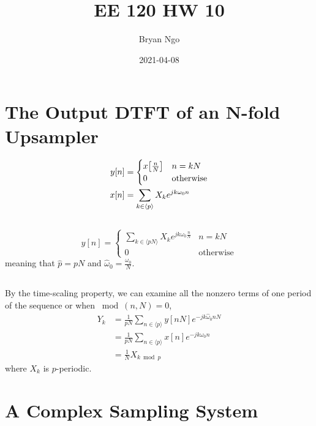 \documentclass{article}
\title{EE 120 HW 10}
\author{Bryan Ngo}
\date{2021-04-08}
\begin{document}
\maketitle

\section{The Output DTFT of an N-fold Upsampler}

\begin{align}
    y[n] &=
    \begin{cases}
        x\qty[\frac{n}{N}] & n = kN \\
        0 & \text{otherwise}
    \end{cases} \\
    x[n] &= \sum_{k \in \langle p \rangle} X_k e^{j k \omega_0 n}
\end{align}

\subsection{}

\begin{equation}
    y[n] =
    \begin{cases}
        \sum_{k \in \langle pN \rangle} X_k e^{j k \omega_0 \frac{n}{N}} & n = kN \\
        0 & \text{otherwise}
    \end{cases}
\end{equation}
meaning that \(\hat{p} = pN\) and \(\hat{\omega}_0 = \frac{\omega_0}{N}\).

\subsection{}

By the time-scaling property, we can examine all the nonzero terms of one period of the sequence or when \(\bmod(n, N) = 0\),
\begin{align}
    Y_k &= \frac{1}{pN} \sum_{n \in \langle p \rangle} y[nN] e^{-j k \hat{\omega}_0 nN} \\
    &= \frac{1}{pN} \sum_{n \in \langle p \rangle} x[n] e^{-j k \omega_0 n} \\
    &= \frac{1}{N} X_{k \bmod p}
\end{align}
where \(X_k\) is \(p\)-periodic.

\section{A Complex Sampling System}
\end{document}
